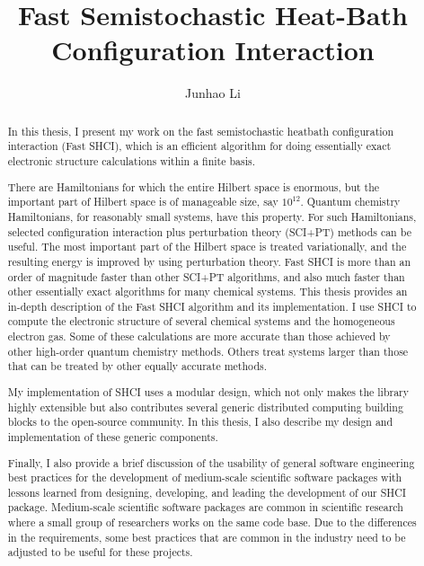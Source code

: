 \documentclass[phd,tocprelim]{cornell}
\title {Fast Semistochastic Heat-Bath Configuration Interaction}
\author {Junhao Li}
\begin{document}
\maketitle
\makecopyright

\begin{abstract}
In this thesis, I present my work on the fast semistochastic heatbath configuration interaction (Fast SHCI), which is an efficient algorithm for
doing essentially exact electronic structure calculations within a finite basis.

There are Hamiltonians for which the entire Hilbert space is enormous, but the important part of Hilbert space
is of manageable size, say $10^{12}$.
Quantum chemistry Hamiltonians, for reasonably small systems, have this property.
For such Hamiltonians, selected configuration interaction plus perturbation theory (SCI+PT) methods can be useful.
The most important part of the Hilbert space is treated variationally, and the resulting energy is improved by
using perturbation theory.
Fast SHCI is more than an order of magnitude faster than other SCI+PT algorithms, and also much faster than other essentially exact algorithms for many chemical systems.
This thesis provides an in-depth description of the Fast SHCI algorithm and its implementation. I use SHCI to compute the electronic structure of several chemical systems and the homogeneous electron gas.
Some of these calculations are more accurate than those achieved by other high-order quantum chemistry methods.  Others treat systems larger than those that can be treated by other equally accurate methods.

My implementation of SHCI uses a modular design, which not only makes the library highly extensible but also contributes several generic distributed computing building blocks to the open-source community. 
In this thesis, I also describe my design and implementation of these generic components.

Finally, I also provide a brief discussion of the usability of general software engineering best practices for the development of medium-scale scientific software packages with lessons learned from designing, developing, and leading the development of our SHCI package.
Medium-scale scientific software packages are common in scientific research where a small group of researchers works on the same code base.
Due to the differences in the requirements, some best practices that are common in the industry need to be adjusted to be useful for these projects.

\end{abstract}
\end{document}
